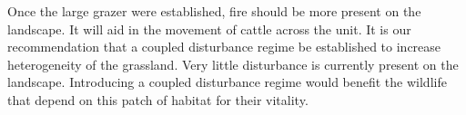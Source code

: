 Once the large grazer were established, fire should be more present on the landscape. 
It will aid in the movement of cattle across the unit. 
It is our recommendation that a coupled disturbance regime be established to increase heterogeneity of the grassland. 
Very little disturbance is currently present on the landscape. 
Introducing a coupled disturbance regime would benefit the wildlife that depend on this patch of habitat for their vitality.
